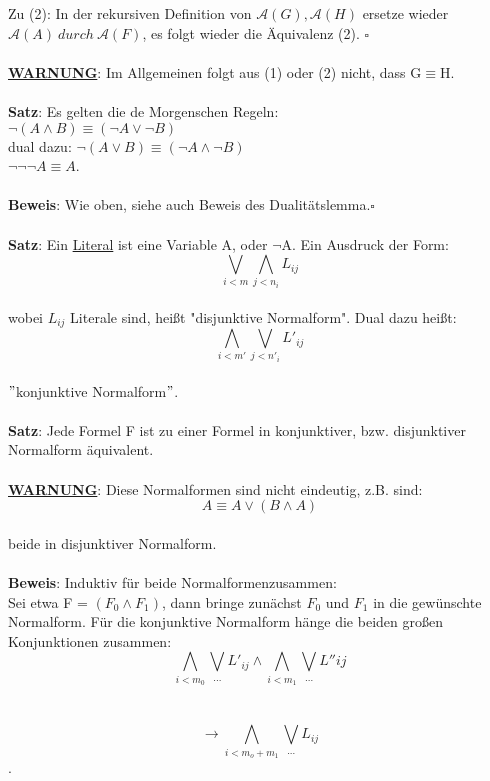 \documentclass[a4paper]{scrartcl}
\begin{document}
Zu (2): In der rekursiven Definition von $\mathcal{A}(G),\mathcal{A}(H)$ ersetze wieder $\mathcal{A}(A)~durch~\mathcal{A}(F)$, es folgt wieder die Äquivalenz (2). $\square$\\ \\
\textbf{\underline{WARNUNG}}: Im Allgemeinen folgt aus (1) oder (2) nicht, dass G$\equiv$H.\\ \\
\textbf{Satz}: Es gelten die de Morgenschen Regeln:\\ 
$\neg(A\land B) \equiv (\neg A \lor \neg B)$\\
dual dazu: $\neg(A \lor B) \equiv (\neg A \land \neg B )$\\
$\neg\neg\neg A \equiv A$.\\ \\
\textbf{Beweis}: Wie oben, siehe auch Beweis des Dualitätslemma.$\square$\\ \\
\textbf{Satz}: Ein \underline{Literal} ist eine Variable A, oder $\neg $A. Ein Ausdruck der Form:\\
$$\bigvee\limits_{i<m}\bigwedge\limits_{j<n_i} L_{ij}$$\\
wobei $L_{ij}$ Literale sind, heißt "disjunktive Normalform". Dual dazu heißt:\\
$$\bigwedge\limits_{i<m'}\bigvee\limits_{j<n'_i}L'_{ij}$$\\
$"$konjunktive Normalform$"$.\\ \\
\textbf{Satz}: Jede Formel F ist zu einer Formel in konjunktiver, bzw. disjunktiver Normalform äquivalent.\\ \\
\textbf{\underline{WARNUNG}}: Diese Normalformen sind nicht eindeutig, z.B. sind:\\ 
$$A\equiv A \lor (B\land A)$$\\
beide in disjunktiver Normalform.\\ \\
\textbf{Beweis}: Induktiv für beide Normalformenzusammen:\\
Sei etwa F = $(F_0 \land F_1)$, dann bringe zunächst $F_0$ und $F_1$ in die gewünschte Normalform. Für die konjunktive Normalform hänge die beiden großen Konjunktionen zusammen:\\
$$\bigwedge\limits_{i<m_0}\bigvee\limits_{...} L'_{ij} \land \bigwedge\limits_{i<m_1} \bigvee\limits_{...} L''{ij}$$\\ \\
$$\rightarrow \bigwedge\limits_{i<m_o+m_1}\bigvee\limits_{...} L_{ij}$$.\\
\end{document}
